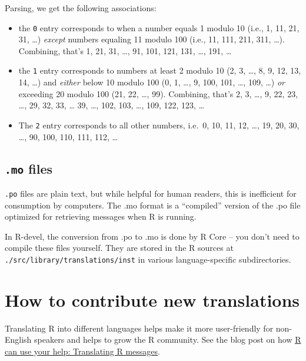 \documentclass[
  letterpaper,
  DIV=11,
  numbers=noendperiod]{scrreprt}
\providecommand{\tightlist}{%
  \setlength{\itemsep}{0pt}\setlength{\parskip}{0pt}}\usepackage{longtable,booktabs,array}
\begin{document}
Parsing, we get the following associations:

\begin{itemize}
\tightlist
\item
  the \texttt{0} entry corresponds to when a number equals 1 modulo 10
  (i.e., 1, 11, 21, 31, \ldots) \emph{except} numbers equaling 11 modulo
  100 (i.e., 11, 111, 211, 311, \ldots). Combining, that's 1, 21, 31,
  \ldots, 91, 101, 121, 131, \ldots, 191, \ldots{}
\item
  the \texttt{1} entry corresponds to numbers at least 2 modulo 10 (2,
  3, \ldots, 8, 9, 12, 13, 14, \ldots) and \emph{either} below 10 modulo
  100 (0, 1, \ldots, 9, 100, 101, \ldots, 109, \ldots) \emph{or}
  exceeding 20 modulo 100 (21, 22, \ldots, 99). Combining, that's 2, 3,
  \ldots, 9, 22, 23, \ldots, 29, 32, 33, \ldots{} 39, \ldots, 102, 103,
  \ldots, 109, 122, 123, \ldots{}
\item
  The \texttt{2} entry corresponds to all other numbers, i.e.~0, 10, 11,
  12, \ldots, 19, 20, 30, \ldots, 90, 100, 110, 111, 112, \ldots{}
\end{itemize}

\subsection{\texorpdfstring{\texttt{.mo}
files}{.mo files}}\label{mo-files}

\texttt{.po} files are plain text, but while helpful for human readers,
this is inefficient for consumption by computers. The .mo format is a
``compiled'' version of the .po file optimized for retrieving messages
when R is running.

In R-devel, the conversion from .po to .mo is done by R Core -- you
don't need to compile these files yourself. They are stored in the R
sources at \texttt{./src/library/translations/inst} in various
language-specific subdirectories.

\section{How to contribute new
translations}\label{how-to-contribute-new-translations}

Translating R into different languages helps make it more user-friendly
for non-English speakers and helps to grow the R community. See the blog
post on how
\href{https://blog.r-project.org/2022/07/25/r-can-use-your-help-translating-r-messages}{R
can use your help: Translating R messages}.
\end{document}
